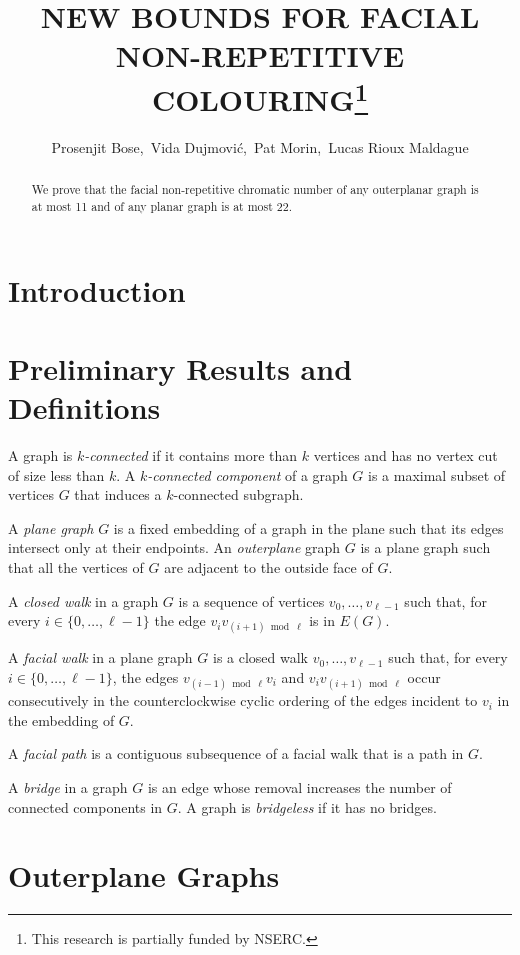 \documentclass{patmorin}
\title{\MakeUppercase{New Bounds for Facial Non-Repetitive Colouring}\thanks{This research is partially funded by NSERC.}}
\author{Prosenjit Bose,\, Vida Dujmovi\'c,\, Pat Morin,\, Lucas Rioux Maldague}
\begin{document}
\maketitle


\begin{abstract}
  We prove that the facial non-repetitive chromatic number of any outerplanar graph is at most 11 and of any planar graph is at most 22.
\end{abstract}


\section{Introduction}

\section{Preliminary Results and Definitions}

A graph is \emph{$k$-connected} if it contains more than $k$ vertices and has
no vertex cut of size less than $k$.  A \emph{$k$-connected component} of a graph $G$ is a maximal subset of vertices $G$ that induces a $k$-connected subgraph.

A \emph{plane graph} $G$ is a fixed embedding of a graph in the plane such
that its edges intersect only at their endpoints. An \emph{outerplane}
graph $G$ is a plane graph such that all the vertices of $G$ are adjacent
to the outside face of $G$.

A \emph{closed walk} in a graph $G$ is a sequence of vertices
$v_0,\ldots,v_{\ell-1}$ such that, for every $i\in\{0,\ldots,\ell-1\}$
the edge $v_iv_{(i+1)\bmod \ell}$ is in $E(G)$.

A \emph{facial walk} in a plane graph $G$ is a closed walk
$v_0,\ldots,v_{\ell-1}$ such that, for every $i\in\{0,\ldots,\ell-1\}$,
the edges $v_{(i-1)\bmod \ell} v_i$ and $v_iv_{(i+1)\bmod\ell}$ occur
consecutively in the counterclockwise cyclic ordering of the edges
incident to $v_i$ in the embedding of $G$.

A \emph{facial path} is a contiguous subsequence of a facial walk that
is a path in $G$.

A \emph{bridge} in a graph $G$ is an edge whose removal increases the number of connected components in $G$.  A graph is \emph{bridgeless} if it has no bridges.


\section{Outerplane Graphs}
\end{document}
